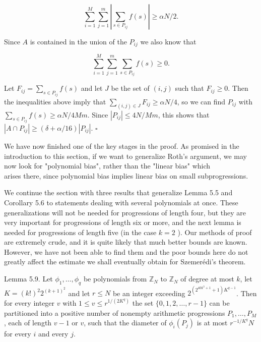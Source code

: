 \documentclass[10pt]{article}
\begin{document}
$$
\sum_{i=1}^{M} \sum_{j=1}^{m}\left|\sum_{s \in P_{i j}} f(s)\right| \geqslant \alpha N / 2 .
$$

Since $A$ is contained in the union of the $P_{i j}$ we also know that

$$
\sum_{i=1}^{M} \sum_{j=1}^{m} \sum_{s \in P_{i j}} f(s)\geqslant 0 .
$$

Let $F_{i j}=\sum_{s \in P_{i j}} f(s)$ and let $J$ be the set of $(i, j)$ such that $F_{i j} \geqslant 0$. Then the inequalities above imply that $\sum_{(i, j) \in J} F_{i j} \geqslant \alpha N / 4$, so we can find $P_{i j}$ with $\sum_{s \in P_{i j}} f(s) \geqslant \alpha N / 4 M m$. Since $\left|P_{i j}\right| \leqslant 4 N / M m$, this shows that $\left|A \cap P_{i j}\right| \geqslant(\delta+\alpha / 16)\left|P_{i j}\right|$. \(\square\)

We have now finished one of the key stages in the proof. As promised in the introduction to this section, if we want to generalize Roth's argument, we may now look for "polynomial bias", rather than the "linear bias" which\\
arises there, since polynomial bias implies linear bias on small subprogressions.

We continue the section with three results that generalize Lemma 5.5 and Corollary 5.6 to statements dealing with several polynomials at once. These generalizations will not be needed for progressions of length four, but they are very important for progressions of length six or more, and the next lemma is needed for progressions of length five (in the case $k=2$ ). Our methods of proof are extremely crude, and it is quite likely that much better bounds are known. However, we have not been able to find them and the poor bounds here do not greatly affect the estimate we shall eventually obtain for Szemerédi's theorem.

Lemma 5.9. Let $\phi_{1}, \ldots, \phi_{q}$ be polynomials from $\mathbb{Z}_{N}$ to $\mathbb{Z}_{N}$ of degree at most $k$, let $K=(k!)^{2} 2^{(k+1)^{2}}$ and let $r\leqslant N$ be an integer exceeding $2^{\left(2^{40 k^{3}+1}+1\right) K^{q-1}}$. Then for every integer $v$ with $1 \leqslant v \leqslant r^{1 /(2 K^{q})}$ the set $\{0,1,2, \ldots, r-1\}$ can be partitioned into a positive number of nonempty arithmetic progressions $P_{1}, \ldots, P_{M}$, each of length $v-1$ or $v$, such that the diameter of $\phi_{i}\left(P_{j}\right)$ is at most $r^{-1 / K^{q}} N$ for every $i$ and every $j$.
\end{document}

